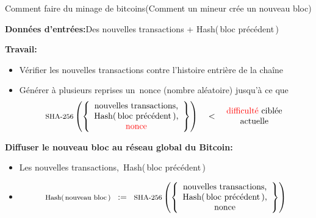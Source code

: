 

\begin{frame}{\vskip -0.4cm\LARGE Comment faire du minage de bitcoins\vskip 0.05cm\normalsize(Comment un mineur cr\'ee un nouveau bloc)}

\scriptsize

\vskip 0.4cm
\textbf{\small Donn\'ees d'entr\'ees:}\;\;Des nouvelles transactions \;+\; Hash(\,bloc pr\'ec\'edent\,)

\vskip 0.5cm
\textbf{\small Travail:}
\begin{itemize}
\item
	{\footnotesize V\'erifier les nouvelles transactions contre l'histoire entri\`ere de la cha\^ine}
\item
	G\'en\'erer \`a plusieurs reprises un \guillemotleft\,nonce\,\guillemotright\,(nombre al\'eatoire) jusqu'\`a ce que
	\vskip -0.1cm
	{\scriptsize\begin{equation*}
	\textnormal{\footnotesize SHA-256}\left(
		\left\{\begin{array}{c}
			\textnormal{nouvelles transactions,}
			\\
			\textnormal{Hash(\,bloc pr\'ec\'edent\,),}
			\\
			\textnormal{{\color{red}nonce}}
		\end{array}\right\}
	\right)
	\quad < \;\;
	\begin{array}{c}
		\textnormal{{\color{red}difficult\'e} cibl\'ee}
		\\
		\textnormal{actuelle}
	\end{array}
	\end{equation*}}
\end{itemize}

\vskip 0.4cm
\textbf{\small Diffuser le {\color{red}nouveau bloc} au r\'eseau global du Bitcoin:}
\begin{itemize}
\item
	Les nouvelles transactions,\, Hash(\,bloc pr\'ec\'edent\,)
\item
	\mbox{}
	\vskip -0.5cm
	{\scriptsize\begin{equation*}
	\textnormal{\footnotesize Hash(\,nouveau bloc\,)}
	\;\; := \;\;
	\textnormal{\footnotesize SHA-256}\left(
		\left\{\begin{array}{c}
			\textnormal{nouvelles transactions,}
			\\
			\textnormal{Hash(\,bloc pr\'ec\'edent\,),}
			\\
			\textnormal{nonce}
		\end{array}\right\}
	\right)
	\end{equation*}}
\end{itemize}

\end{frame}
\normalsize

